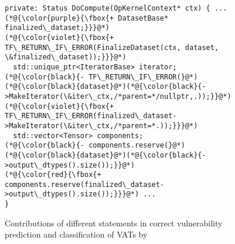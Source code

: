 \begin{figure}[t]
\centering
{}
	\begin{lstlisting}[]
private: Status DoCompute(OpKernelContext* ctx) { ...
(*@{\color{purple}{\fbox{+ DatasetBase* finalized\_dataset;}}}@*)
(*@{\color{violet}{\fbox{+ TF\_RETURN\_IF\_ERROR(FinalizeDataset(ctx, dataset, \&finalized\_dataset));}}}@*)
  std::unique_ptr<IteratorBase> iterator;
(*@{\color{black}{- TF\_RETURN\_IF\_ERROR(}@*)(*@{\color{black}{dataset}@*)(*@{\color{black}{->MakeIterator(\&iter\_ctx,/*parent=*/nullptr,.));}}@*)
(*@{\color{violet}{\fbox{+ TF\_RETURN\_IF\_ERROR(finalized\_dataset->MakeIterator(\&iter\_ctx,/*parent=*.));}}}@*)
  std::vector<Tensor> components;
(*@{\color{black}{- components.reserve(}@*)(*@{\color{black}{dataset}@*)(*@{\color{black}{->output\_dtypes().size());}}@*)
(*@{\color{red}{\fbox{+ components.reserve(finalized\_dataset->output\_dtypes().size());}}}@*) ...
}
\end{lstlisting}
\vspace{-19pt}
\caption{Contributions of different statements in correct
vulnerability prediction and classification of VATs by {\tool}}
\vspace{-4pt}
\label{gnn-example}
\end{figure}
